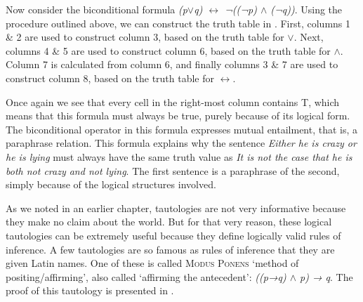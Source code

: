 Now consider the biconditional formula \textit{(p$\vee$q) $\leftrightarrow $ ¬((¬p) $\wedge$ (¬q))}. Using the procedure outlined above, we can construct the truth table in . First, columns 1 \& 2 are used to construct column 3, based on the truth table for \textit{$\vee$}. Next, columns 4 \& 5 are used to construct column 6, based on the truth table for \textit{$\wedge$}. Column 7 is calculated from column 6, and finally columns 3 \& 7 are used to construct column 8, based on the truth table for \textit{$\leftrightarrow $}.



Once again we see that every cell in the right-most column contains T, which means that this formula must always be true, purely because of its logical form. The biconditional operator in this formula expresses mutual entailment, that is, a paraphrase relation. This formula explains why the sentence \textit{Either he is crazy or he is lying} must always have the same truth value as \textit{It is not the case that he is both not crazy and not lying}. The first sentence is a paraphrase of the second, simply because of the logical structures involved.



As we noted in an earlier chapter, tautologies are not very informative because they make no claim about the world. But for that very reason, these logical tautologies can be extremely useful because they define logically valid rules of inference. A few tautologies are so famous as rules of inference that they are given Latin names. One of these is called \textsc{Modus Ponens} ‘method of positing/affirming’, also called ‘affirming the antecedent’: \textit{((p→q) $\wedge$ p) → q}. The proof of this tautology is presented in .


